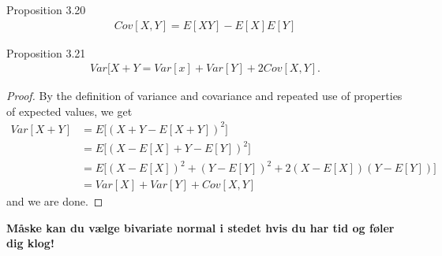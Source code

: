 \begin{boks}{Proposition 3.20}
  \begin{align*}
    Cov[X, Y] = E[XY] - E[X]E[Y]
  \end{align*}
\end{boks}
%
%
\begin{boks}{Proposition 3.21}
  \begin{align*}
    Var[X + Y = Var[x] + Var[Y] + 2Cov[X, Y].
  \end{align*}
\end{boks}

\begin{proof}
  By the definition of variance and covariance and repeated use of properties of expected values, we get
  \begin{align*}
    Var[X + Y] &= E\Big[(X + Y - E[X + Y])^2]\\
    &= E\Big[(X - E[X] + Y - E[Y])^2]\\
    &= E\Big[(X - E[X])^2 + (Y - E[Y])^2 + 2(X - E[X])(Y - E[Y])]\\
    &= Var[X] + Var[Y] + Cov[X, Y]
  \end{align*}
  and we are done.
\end{proof}

\textbf{Måske kan du vælge bivariate normal i stedet hvis du har tid og føler dig klog!}


